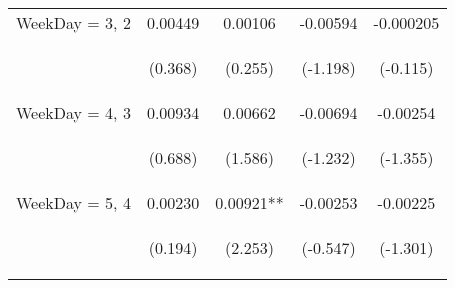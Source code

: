 \documentclass[]{article}
\begin{document}
\begin{center}
\begin{tabular}{lcccc}
        WeekDay = 3, 2   & 0.00449                                         & 0.00106                                        & -0.00594                                       & -0.000205                                      \\
        \vspace{4pt}     & \begin{footnotesize}(0.368)\end{footnotesize}   & \begin{footnotesize}(0.255)\end{footnotesize}  & \begin{footnotesize}(-1.198)\end{footnotesize} & \begin{footnotesize}(-0.115)\end{footnotesize} \\
        WeekDay = 4, 3   & 0.00934                                         & 0.00662                                        & -0.00694                                       & -0.00254                                       \\
        \vspace{4pt}     & \begin{footnotesize}(0.688)\end{footnotesize}   & \begin{footnotesize}(1.586)\end{footnotesize}  & \begin{footnotesize}(-1.232)\end{footnotesize} & \begin{footnotesize}(-1.355)\end{footnotesize} \\
        WeekDay = 5, 4   & 0.00230                                         & 0.00921**                                      & -0.00253                                       & -0.00225                                       \\
        \vspace{4pt}     & \begin{footnotesize}(0.194)\end{footnotesize}   & \begin{footnotesize}(2.253)\end{footnotesize}  & \begin{footnotesize}(-0.547)\end{footnotesize} & \begin{footnotesize}(-1.301)\end{footnotesize} \\

\end{tabular}
\end{center}
\end{document}
